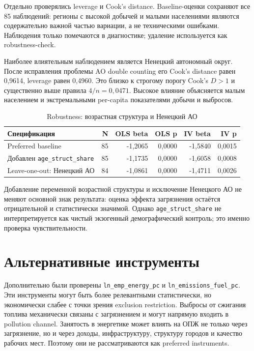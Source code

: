 \documentclass[10pt,a4paper]{article}
\begin{document}
Отдельно проверялись leverage и Cook's distance. Baseline-оценки сохраняют все 85 наблюдений: регионы с высокой добычей и малыми населениями являются содержательно важной частью вариации, а не техническими ошибками. Наблюдения только помечаются в диагностике; удаление используется как robustness-check.

Наиболее влиятельным наблюдением является Ненецкий автономный округ. После исправления проблемы AO double counting его Cook's distance равен 0{,}9614, leverage равен 0{,}4960. Это близко к строгому порогу Cook's $D>1$ и существенно выше правила $4/n=0{,}0471$. Высокое влияние объясняется малым населением и экстремальными per-capita показателями добычи и выбросов.

\begin{table}[H]
\centering
\caption{Robustness: возрастная структура и Ненецкий АО}
\label{tab:robust_age}
\begin{tabular}{lrrrrr}
\toprule
\textbf{Спецификация} & \textbf{N} & \textbf{OLS beta} & \textbf{OLS p} & \textbf{IV beta} & \textbf{IV p} \\
\midrule
Preferred baseline & 85 & -1{,}2065 & 0{,}0000 & -1{,}5840 & 0{,}0015 \\
Добавлен \texttt{age\_struct\_share} & 85 & -1{,}1735 & 0{,}0000 & -1{,}6058 & 0{,}0008 \\
Leave-one-out: Ненецкий АО & 84 & -1{,}0861 & 0{,}0000 & -1{,}4711 & 0{,}0026 \\
\bottomrule
\end{tabular}
\end{table}

Добавление переменной возрастной структуры и исключение Ненецкого АО не меняют основной знак результата: оценка эффекта загрязнения остаётся отрицательной и статистически значимой. Однако \texttt{age\_struct\_share} не интерпретируется как чистый экзогенный демографический контроль; это именно проверка чувствительности.

\section{Альтернативные инструменты}

Дополнительно были проверены \texttt{ln\_emp\_energy\_pc} и \texttt{ln\_emissions\_fuel\_pc}. Эти инструменты могут быть более релевантными статистически, но экономически слабее с точки зрения exclusion restriction. Выбросы от сжигания топлива механически связаны с загрязнением и могут напрямую входить в pollution channel. Занятость в энергетике может влиять на ОПЖ не только через загрязнение, но и через доходы, инфраструктуру, структуру городов и качество рабочих мест. Поэтому они не рассматриваются как preferred instruments.
\end{document}
